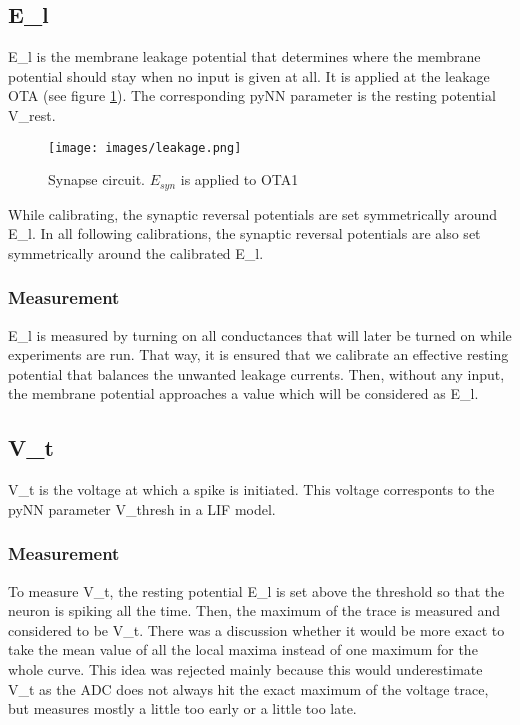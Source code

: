 \documentclass[12pt,a4paper,bibliography=totocnumbered,listof=totocnumbered]{scrartcl}
\begin{document}
\subsection{E\_l}
E\_l is the membrane leakage potential that determines where the membrane potential should stay when no input is given at all. It is applied at the leakage OTA (see figure \ref{figure:leakage}). The corresponding pyNN parameter is the resting potential V\_rest.

\begin{figure}[h]
\begin{center}
\texttt{[image: images/leakage.png]}
\caption{Synapse circuit. $E_{syn}$ is applied to OTA1}
\label{figure:leakage}
\end{center}
\end{figure}

While calibrating, the synaptic reversal potentials are set symmetrically around E\_l. In all following calibrations, the synaptic reversal potentials are also set symmetrically around the calibrated E\_l.

\subsubsection*{Measurement}
E\_l is measured by turning on all conductances that will later be turned on while experiments are run. That way, it is ensured that we calibrate an effective resting potential that balances the unwanted leakage currents. Then, without any input, the membrane potential approaches a value which will be considered as E\_l.

\subsection{V\_t}
V\_t is the voltage at which a spike is initiated. This voltage corresponts to the pyNN parameter V\_thresh in a LIF model.

\subsubsection*{Measurement}
To measure V\_t, the resting potential E\_l is set above the threshold so that the neuron is spiking all the time. Then, the maximum of the trace is measured and considered to be V\_t. There was a discussion whether it would be more exact to take the mean value of all the local maxima instead of one maximum for the whole curve. This idea was rejected mainly because this would underestimate V\_t as the ADC does not always hit the exact maximum of the voltage trace, but measures mostly a little too early or a little too late.
\end{document}
